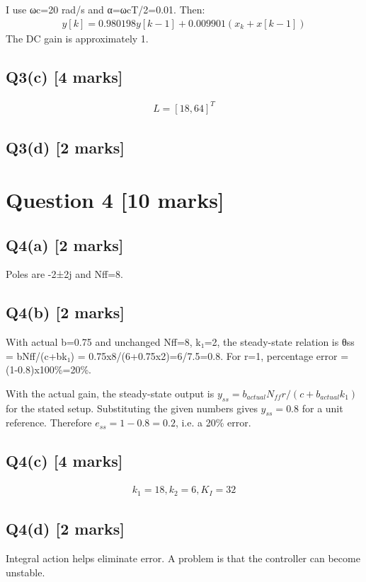 \documentclass[11pt,a4paper]{article}
\begin{document}
I use ωc=20 rad/s and α=ωcT/2=0.01.
Then:\[\begin{aligned}y[k] = 0.980198y[k-1] + 0.009901(x_k+x[k-1])\end{aligned}\]
The DC gain is approximately 1.

\subsection*{Q3(c) \hfill [4 marks]}

\[\begin{aligned}L = [18,64]^T\end{aligned}\]

\subsection*{Q3(d) \hfill [2 marks]}

\vspace{2mm}

\section*{Question 4 \hfill [10 marks]}
\subsection*{Q4(a) \hfill [2 marks]}

Poles are -2±2j and Nff=8.

\subsection*{Q4(b) \hfill [2 marks]}

With actual b=0.75 and unchanged Nff=8, k₁=2, the steady-state relation is θss = bNff/(c+bk₁) = 0.75x8/(6+0.75x2)=6/7.5=0.8.
For r=1, percentage error = (1-0.8)x100\%=20\%.\par\smallskip With the actual gain, the steady-state output is $y_{ss}=b_{actual}N_{ff}r/ (c+b_{actual}k_1)$ for the stated setup. Substituting the given numbers gives $y_{ss}=0.8$ for a unit reference. Therefore $e_{ss}=1-0.8=0.2$, i.e. a 20\% error.

\subsection*{Q4(c) \hfill [4 marks]}

\[\begin{aligned}k_1=18, k_2=6, K_I=32\end{aligned}\]

\subsection*{Q4(d) \hfill [2 marks]}

Integral action helps eliminate error.
A problem is that the controller can become unstable.
\end{document}
